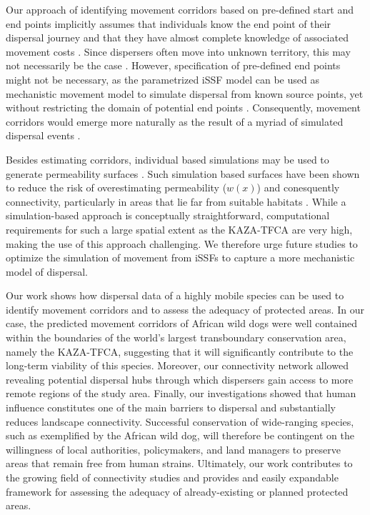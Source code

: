 \documentclass[abstract=on,10pt,a4paper,bibliography=totocnumbered]{article}
\begin{document}
Our approach of identifying movement corridors based on pre-defined start and
end points implicitly assumes that individuals know the end point of their
dispersal journey and that they have almost complete knowledge of associated
movement costs \citep{Panzacchi.2016}. Since dispersers often move into unknown
territory, this may not necessarily be the case \citep{Abrahms.2017,
Cozzi.2020}. However, specification of pre-defined end points might not be
necessary, as the parametrized iSSF model can be used as mechanistic movement
model to simulate dispersal from known source points, yet without restricting
the domain of potential end points \citep{Signer.2017}. Consequently, movement
corridors would emerge more naturally as the result of a myriad of simulated
dispersal events \citep{Allen.2016, Zeller.2020}.

Besides estimating corridors, individual based simulations may be used to
generate permeability surfaces \citep{Avgar.2016, Signer.2017}. Such simulation
based surfaces have been shown to reduce the risk of overestimating permeability
(\(w(x)\)) and conesquently connectivity, particularly in areas that lie far
from suitable habitats \citep{Signer.2017}. While a simulation-based approach is
conceptually straightforward, computational requirements for such a large
spatial extent as the KAZA-TFCA are very high, making the use of this approach
challenging. We therefore urge future studies to optimize the simulation of
movement from iSSFs to capture a more mechanistic model of dispersal.

Our work shows how dispersal data of a highly mobile species can be used to
identify movement corridors and to assess the adequacy of protected areas. In
our case, the predicted movement corridors of African wild dogs were well
contained within the boundaries of the world's largest transboundary
conservation area, namely the KAZA-TFCA, suggesting that it will significantly
contribute to the long-term viability of this species. Moreover, our
connectivity network allowed revealing potential dispersal hubs through which
dispersers gain access to more remote regions of the study area. Finally, our
investigations showed that human influence constitutes one of the main barriers
to dispersal and substantially reduces landscape connectivity. Successful
conservation of wide-ranging species, such as exemplified by the African wild
dog, will therefore be contingent on the willingness of local authorities,
policymakers, and land managers to preserve areas that remain free from human
strains. Ultimately, our work contributes to the growing field of connectivity
studies and provides and easily expandable framework for assessing the adequacy
of already-existing or planned protected areas.
\end{document}
